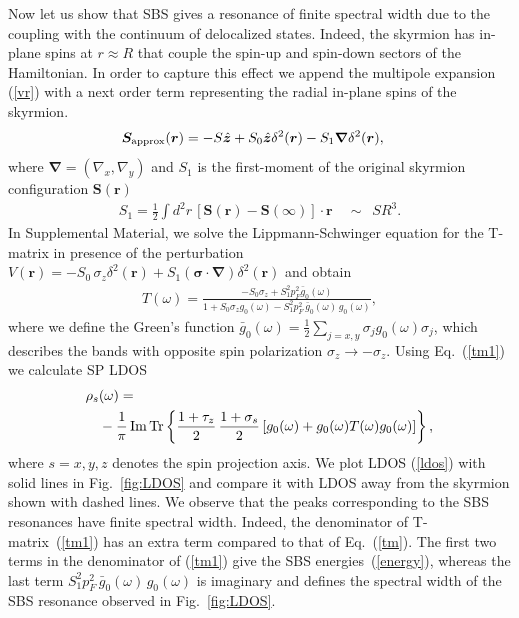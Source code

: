 \documentclass[twocolumn,showpacs,floatfix,longbibliography]{revtex4-1}
\begin{document}
Now let us show that SBS gives a resonance of finite spectral width due to the coupling with the continuum of delocalized states. Indeed, the skyrmion has in-plane spins at $r\approx R$ that couple the spin-up and spin-down sectors of the Hamiltonian. In order to capture this effect we append the multipole expansion (\ref{vr}) with a next order term  representing the radial in-plane spins of the skyrmion.
\begin{align}
	\bm S_{\rm approx}(\bm r) & =  - S \hat{\bm z} + S_0 \hat{\bm z} \delta^2(\bm r)-S_1 \bm \nabla \delta^2(\bm r), \label{vr1}
\end{align}
where  $\bm \nabla = (\nabla_x,\nabla_y)$ and $S_1$ is the first-moment of the original skyrmion configuration $\bm S(\bm r)$
\begin{align}
	S_1 = \frac{1}{2}\int  d^2r \, \left[\bm S(\bm r)-\bm S(\infty)\right] \cdot \bm r\quad \sim \,\,\,SR^3. \label{S1}
\end{align}
In Supplemental Material, we solve the Lippmann-Schwinger equation for the T-matrix in presence of the perturbation $V(\bm r)=-S_0\,\sigma_z\delta^2(\bm r)+S_1 (\bm\sigma\cdot\bm \nabla) \delta^2(\bm r)$ and obtain
\begin{align}
	T(\omega) =   \frac{-S_0\sigma_z+S^2_1p_F^2\bar g_{0}(\omega)}{1+S_0\sigma_zg_{0}(\omega)-S^2_1p_F^2\,\bar g_{0}(\omega)\, g_{0}(\omega)}, \label{tm1}
\end{align}
where we define the Green's function $\bar g_0(\omega) = \frac{1}{2}\sum_{j=x,y} \sigma_j g_0(\omega) \sigma_j $, which describes the bands with opposite spin polarization $\sigma_z\rightarrow -\sigma_z$. Using Eq.~(\ref{tm1}) we calculate SP LDOS
\begin{align}
	\rho_s & (\omega) = \label{ldos} \\
	&-\frac{1}{\pi}\,{\rm Im}{\rm \,Tr} \left\{  \frac{1+\tau_z}{2}\,\frac{1+\sigma_s}{2} \left[g_0(\omega)+g_0(\omega) T(\omega) g_0(\omega)  \right]\right\},\nonumber
\end{align}
where $s=x,y,z$ denotes the spin projection axis. We plot LDOS (\ref{ldos}) with solid lines in Fig.~\ref{fig:LDOS} and compare it with LDOS away from the skyrmion shown with dashed lines. We observe that the peaks corresponding to the SBS resonances have finite spectral width. Indeed, the denominator of T-matrix~(\ref{tm1}) has an extra term compared to that of Eq.~(\ref{tm}). The first two terms in the denominator of (\ref{tm1}) give the SBS energies~(\ref{energy}), whereas the last term $S^2_1p_F^2\,\bar g_{0}(\omega)\, g_{0}(\omega)$ is imaginary and defines the spectral width of the SBS resonance observed in Fig.~\ref{fig:LDOS}.
\end{document}
